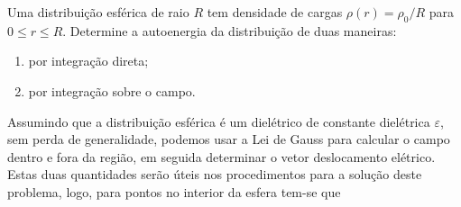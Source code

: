 \begin{prob}
	Uma distribuição esférica de raio $R$ tem densidade de cargas $\rho(r)=\rho_{0}/R$ para $0\leq r \leq R$. Determine a autoenergia da distribuição de duas maneiras:
	\begin{enumerate}[label=\alph *)]
		\item por integração direta;
		\item por integração sobre o campo.
	\end{enumerate}

	\begin{sol}
		Assumindo que a distribuição esférica é um dielétrico de constante dielétrica $\varepsilon$, sem perda de generalidade, podemos usar a Lei de Gauss para calcular o campo dentro e fora da região, em seguida determinar o vetor deslocamento elétrico. Estas duas quantidades serão úteis nos procedimentos para a solução deste problema, logo, para pontos no interior da esfera tem-se que


\end{sol}
\end{prob}
